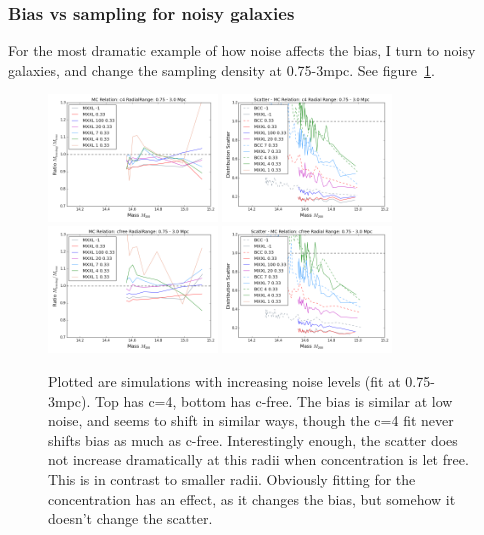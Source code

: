 \documentclass[11pt]{article}
\begin{document}

\subsubsection{Bias vs sampling for noisy galaxies}

For the most dramatic example of how noise affects the bias, I turn to noisy galaxies, and change the sampling density at 0.75-3mpc. See figure~\ref{fig:noisebias_noisygals_sparsesampling}.

\begin{figure}
\centering
\includegraphics[width=0.4\textwidth]{figures/density_noise2_c4-r10}
\includegraphics[width=0.4\textwidth]{figures/density_noise2_c4-r10_scatter}\\
\includegraphics[width=0.4\textwidth]{figures/density_noise2_cfree-r10}
\includegraphics[width=0.4\textwidth]{figures/density_noise2_cfree-r10_scatter}
\caption{Plotted are simulations with increasing noise levels (fit at 0.75-3mpc). Top has c=4, bottom has c-free. The bias is similar at low noise, and seems to shift in similar ways, though the c=4 fit never shifts bias as much as c-free. Interestingly enough, the scatter does not increase dramatically at this radii when concentration is let free. This is in contrast to smaller radii. Obviously fitting for the concentration has an effect, as it changes the bias, but somehow it doesn't change the scatter.}
\label{fig:noisebias_noisygals_sparsesampling}
\end{figure}
\end{document}
